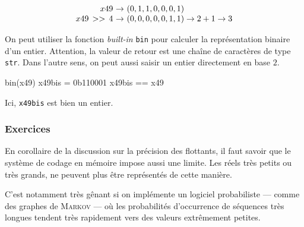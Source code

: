 \begin{equation}
\begin{array}{r@{~}c@{~}l}
x49 & \rightarrow & (0, 1, 1, 0, 0, 0, 1) \\
x49\, >> \, 4 &\rightarrow & (0, 0, 0, 0, 0, 1, 1) \rightarrow 2 + 1 \rightarrow 3
\end{array}
\end{equation}


On peut utiliser la fonction \textit{built-in} \texttt{bin} pour calculer la représentation binaire d'un entier. Attention, la valeur de retour est une chaîne de caractères de type \texttt{str}. Dans l'autre sens, on peut aussi saisir un entier directement en base $2$.

\begin{idleconsole}
	\begin{pyconsole}
		bin(x49)
		x49bis = 0b110001
		x49bis == x49
	\end{pyconsole}
\end{idleconsole}

Ici, \texttt{x49bis} est bien un entier.


\subsubsection[Exercices]{Exercices}
\label{subsub:X.3.2.3}

En corollaire de la discussion sur la précision des flottants, il faut savoir que le système de codage en mémoire impose aussi une limite. Les réels très petits ou très grands, ne peuvent plus être représentés de cette manière.

C'est notamment très gênant si on implémente un logiciel probabiliste --- comme des graphes de \textsc{Markov} --- où les probabilités d'occurrence de séquences très longues tendent très rapidement vers des valeurs extrêmement petites.


